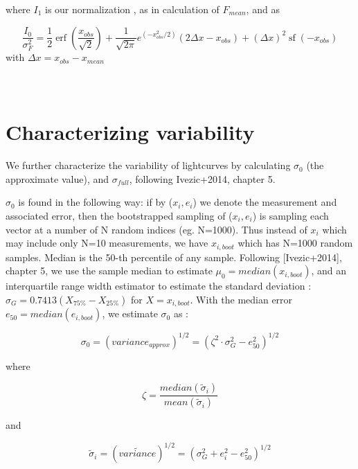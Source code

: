 \documentclass[fleqn,usenatbib]{mnras}  %
\DeclareMathOperator\erf{erf}
\DeclareMathOperator\sf{sf}
\begin{document}
where $I_{1}$ is our normalization , as in calculation of $F_{mean}$, and as 


\begin{equation}
\frac{I_{0}}{ \sigma_{F}^{2}} = \frac{1}{2} \erf\left(\frac{x_{obs}}{\sqrt{2}}\right) + \frac{1}{\sqrt{2\pi}} e^{(-x_{obs}^{2} / 2)} (2 \Delta x - x_{obs}) + (\Delta x)^{2} \sf(-x_{obs})
\end{equation}
with  $\Delta x = x_{obs} - x_{mean}$

\section{\\ Characterizing variability}
\label{App:AppendixB}


We further characterize the variability of lightcurves by calculating $\sigma_{0}$ (the approximate value), and $\sigma_{full}$, following Ivezic+2014, chapter 5. 

$\sigma_{0}$ is found in the following way: if by ($x_{i}, e_{i}$) we denote the measurement and associated error, then the bootstrapped sampling of ($x_{i}, e_{i}$) is sampling each vector at a number of N random indices (eg. N=1000). Thus instead of $x_{i}$ which may include only N=10 measurements, we have $x_{i,boot}$ which has N=1000 random samples. Median is the 50-th percentile of any sample.  Following [Ivezic+2014], chapter 5, we use the sample median to estimate $\mu_{0} = median(x_{i,boot})$, and an interquartile range width estimator to estimate the standard deviation : $\sigma_{G} =0.7413 (X_{75\%} - X_{25\%}) $ for $X = x_{i,boot}$.
With the median error $e_{50} = median(e_{i,boot})$, we estimate $\sigma_{0}$ as : 

\begin{equation}
\sigma_{0} = ( variance_{approx} )^{1/2} = (\zeta^{2} \cdot \sigma_{G}^{2} - e_{50} ^ {2})^{1/2}
\end{equation}

where 

\begin{equation}
\zeta = \frac{median(\widetilde{\sigma}_{i})} {mean(\widetilde{\sigma}_{i})}
\end{equation}

and 

\begin{equation}
\widetilde{\sigma}_{i} =  ( \widetilde{variance} )^{1/2} = ( \sigma_{G}^{2} + e_{i}^{2} - e_{50}^{2} )^{1/2}
\end{equation}
\end{document}
